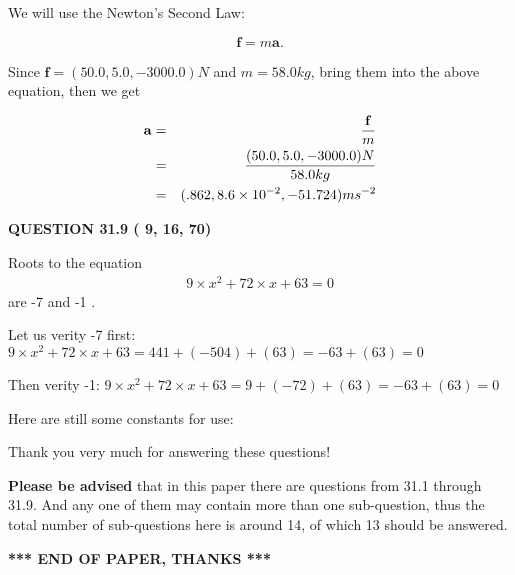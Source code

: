 \documentclass[12pt]{article}
\begin{document}
  
 
 

We will use the Newton's Second Law:
 
\[
\mathbf{f}=m\mathbf{a}.
\]
 
Since $\mathbf{f}= %
(50.0 , 5.0 , -3000.0) N$
and $m= %
58.0kg$, bring them into the above equation, then we get
 
\begin{eqnarray*}
\mathbf{a}&=&\frac{\mathbf{f}}m  \\
&=&\frac{ %
(50.0 , 5.0 , -3000.0) N}{ %
58.0kg}  \\
&=& %
(.862 , 8.6 \times 10^{-2} , -51.724) ms^{-2}
\end{eqnarray*}
 
 
 
  
\vspace{0.2in}
  
{\textbf{\Large{QUESTION
31.9 
 (          9,         16,         70)
}}}
  
  


 
 

Roots to the equation
\begin{eqnarray*}
9 \times x^2  %
+  %
72
                 \times x    %
+  %
63 =0
\end{eqnarray*}
are  %
-7 and  %
-1 .
 
Let us verity  %
-7 first:
$  %
9 \times x^2  %
+  %
72
                 \times x    %
+  %
63
  = %
441+( %
-504)+( %
63)
  = %
-63+( %
63)
  = %
0
$
 
Then verity  %
-1:
$  %
9 \times x^2  %
+  %
72
                 \times x    %
+  %
63
  = %
9+( %
-72)+( %
63)
  = %
-63+( %
63)
  = %
0
$
 
 
 
   
   
 \vspace{0.2in}
Here are still some constants for use:
 
 
 
 
Thank you very much for answering these questions!
 
{\textbf{\large{Please be advised}}} that in this paper there are questions from
31.1 through
31.9.
And any one of them may contain more than one sub-question, thus the total number
of sub-questions here is around 14, of which
13 should be answered.
 
   
   
   
   
\vspace{1.0in} 
{\textbf{\large{ *** END OF PAPER, THANKS *** }}} 
   
\end{document}
